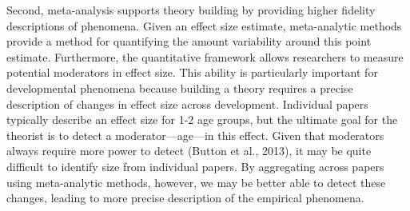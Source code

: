 \documentclass[9pt,twocolumn,twoside,lineno]{pnas-new}
\begin{document}
Second, meta-analysis supports theory building by providing higher
fidelity descriptions of phenomena. Given an effect size estimate,
meta-analytic methods provide a method for quantifying the amount
variability around this point estimate. Furthermore, the quantitative
framework allows researchers to measure potential moderators in effect
size. This ability is particularly important for developmental phenomena
because building a theory requires a precise description of changes in
effect size across development. Individual papers typically describe an
effect size for 1-2 age groups, but the ultimate goal for the theorist
is to detect a moderator---age---in this effect. Given that moderators
always require more power to detect (Button et al., 2013), it may be
quite difficult to identify size from individual papers. By aggregating
across papers using meta-analytic methods, however, we may be better
able to detect these changes, leading to more precise description of the
empirical phenomena.

\renewcommand{\arraystretch}{1.5}
\end{document}
